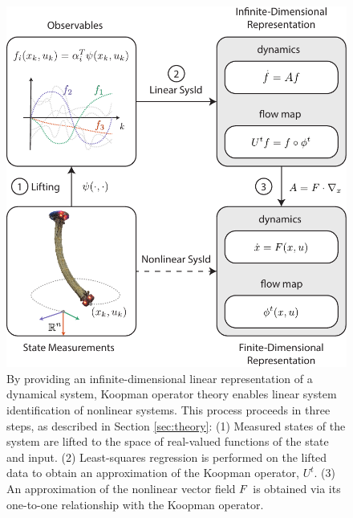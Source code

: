 \begin{figure}[t]
    \centering
    \includegraphics[width=\linewidth]{figures/overviewDiagram_eqBigger_fixed_L2A.pdf}
    \caption{By providing an infinite-dimensional linear representation of a dynamical system, Koopman operator theory enables linear system identification of nonlinear systems. 
    This process proceeds in three steps, as described in Section \ref{sec:theory}:
    (1) Measured states of the system are lifted to the space of real-valued functions of the state and input.
    (2) Least-squares regression is performed on the lifted data to obtain an approximation of the Koopman operator, $U^t$.
    (3) An approximation of the nonlinear vector field $F$ is obtained via its one-to-one relationship with the Koopman operator.}
    \label{fig:overview}
\end{figure}


